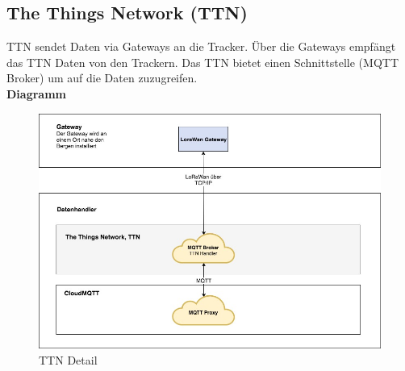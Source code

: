 \documentclass[11pt,english,german]{report}
\theoremstyle{definition}
\begin{document}
\subsection{The Things Network (TTN)}
TTN sendet Daten via Gateways an die Tracker. Über die Gateways empfängt das TTN Daten von den Trackern. Das TTN bietet einen Schnittstelle (MQTT Broker) um auf die Daten zuzugreifen.\\[0.3cm]
\textbf{Diagramm}
\begin{figure}[H]
	\centering
	\includegraphics[width=\textwidth]{img/system/ATAS_SystemOverview_TTN_BA.jpg}
	\caption[TTN Detail]
	{TTN Detail}
\end{figure}

\newpage
\end{document}
